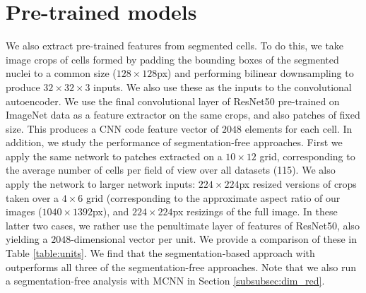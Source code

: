 
\section{Pre-trained models}

We also extract pre-trained features from segmented cells. To do this, we take image crops of cells formed by padding the bounding boxes of the segmented nuclei to a common size ($128\times 128$px) and performing bilinear downsampling to produce $32 \times 32 \times 3$ inputs. We also use these as the inputs to the convolutional autoencoder. We use the final convolutional layer of ResNet50 pre-trained on ImageNet data as a feature extractor on the same crops, and also patches of fixed size. This produces a CNN code feature vector of $2048$ elements for each cell. In addition, we study the performance of segmentation-free approaches. First we apply the same network to patches extracted on a $10 \times 12$ grid, corresponding to the average number of cells per field of view over all datasets (115). We also apply the network to larger network inputs: $224 \times 224$px resized versions of crops taken over a $4 \times 6$ grid (corresponding to the approximate aspect ratio of our images ($1040 \times 1392$px), and $224 \times 224$px resizings of the full image. In these latter two cases, we rather use the penultimate layer of features of ResNet50, also yielding a $2048$-dimensional vector per unit. We provide a comparison of these in Table \ref{table:units}. We find that the segmentation-based approach with  outperforms all three of the segmentation-free approaches. Note that we also run a segmentation-free analysis with MCNN in Section \ref{subsubsec:dim_red}.
